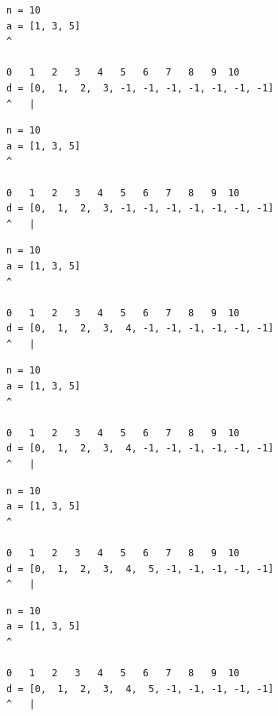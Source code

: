 \begin{frame}[fragile]
\begin{verbatim}
n = 10
a = [1, 3, 5]
^

0   1   2   3   4   5   6   7   8   9  10
d = [0,  1,  2,  3, -1, -1, -1, -1, -1, -1, -1]
^   |
\end{verbatim}
\end{frame}
\addtocounter{framenumber}{-1}

\begin{frame}[fragile]
\begin{verbatim}
n = 10
a = [1, 3, 5]
^

0   1   2   3   4   5   6   7   8   9  10
d = [0,  1,  2,  3, -1, -1, -1, -1, -1, -1, -1]
^   |
\end{verbatim}
\end{frame}
\addtocounter{framenumber}{-1}

\begin{frame}[fragile]
\begin{verbatim}
n = 10
a = [1, 3, 5]
^

0   1   2   3   4   5   6   7   8   9  10
d = [0,  1,  2,  3,  4, -1, -1, -1, -1, -1, -1]
^   |
\end{verbatim}
\end{frame}
\addtocounter{framenumber}{-1}

\begin{frame}[fragile]
\begin{verbatim}
n = 10
a = [1, 3, 5]
^

0   1   2   3   4   5   6   7   8   9  10
d = [0,  1,  2,  3,  4, -1, -1, -1, -1, -1, -1]
^   |
\end{verbatim}
\end{frame}
\addtocounter{framenumber}{-1}

\begin{frame}[fragile]
\begin{verbatim}
n = 10
a = [1, 3, 5]
^

0   1   2   3   4   5   6   7   8   9  10
d = [0,  1,  2,  3,  4,  5, -1, -1, -1, -1, -1]
^   |
\end{verbatim}
\end{frame}
\addtocounter{framenumber}{-1}

\begin{frame}[fragile]
\begin{verbatim}
n = 10
a = [1, 3, 5]
^

0   1   2   3   4   5   6   7   8   9  10
d = [0,  1,  2,  3,  4,  5, -1, -1, -1, -1, -1]
^   |
\end{verbatim}
\end{frame}
\addtocounter{framenumber}{-1}

